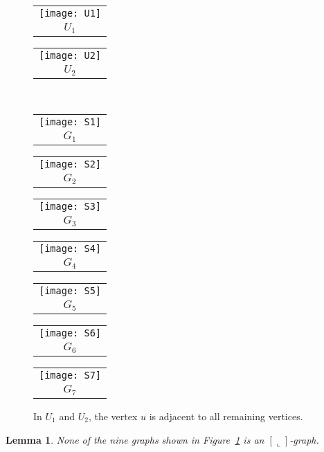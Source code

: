 \documentclass[11pt,3p,times]{elsarticle}
\newcommand{\La}{\ensuremath{\llcorner}} \newcommand{\Lb}{\ensuremath{\ulcorner}} \newcommand{\Lc}{\ensuremath{\lrcorner}} \newcommand{\Ld}{\ensuremath{\urcorner}}
\newtheorem{lemma}[theorem]{Lemma}
\begin{document}
\begin{figure}
\centering \hfill
\begin{tabular}{c}
\texttt{[image: U1]} \\ $U_1$
\end{tabular}
\hfill
\begin{tabular}{c}
\texttt{[image: U2]} \\ $U_2$
\end{tabular}
\hfill \
\par
\begin{tabular}{c}
\texttt{[image: S1]} \\ $G_1$
\end{tabular}
\hfill
\begin{tabular}{c}
\texttt{[image: S2]} \\ $G_2$
\end{tabular}
\hfill
\begin{tabular}{c}
\texttt{[image: S3]} \\ $G_3$
\end{tabular}
\hfill
\begin{tabular}{c}
\texttt{[image: S4]} \\ $G_4$
\end{tabular}
\hfill
\begin{tabular}{c}
\texttt{[image: S5]} \\ $G_5$
\end{tabular}
\hfill
\begin{tabular}{c}
\texttt{[image: S6]} \\ $G_6$
\end{tabular}
\hfill
\begin{tabular}{c}
\texttt{[image: S7]} \\ $G_7$
\end{tabular}
\caption{In $U_1$ and $U_2$, the vertex $u$ is adjacent to all
remaining vertices.}\label{fig:characterization}
\end{figure}
\begin{lemma}\label{lem:9graphs}
None of the nine graphs shown in Figure~\ref{fig:characterization}
is an $[\La]$-graph.
\end{lemma}
\end{document}
